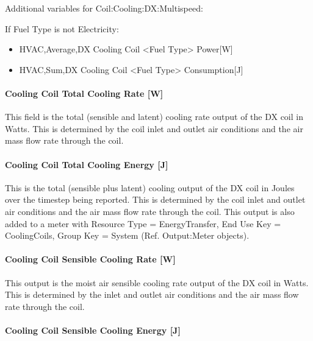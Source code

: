 Additional variables for Coil:Cooling:DX:Multispeed:

If Fuel Type is not Electricity:

\begin{itemize}
\item
  HVAC,Average,DX Cooling Coil \textless{}Fuel Type\textgreater{} Power{[}W{]}
\item
  HVAC,Sum,DX Cooling Coil \textless{}Fuel Type\textgreater{} Consumption{[}J{]}
\end{itemize}

\paragraph{Cooling Coil Total Cooling Rate {[}W{]}}\label{cooling-coil-total-cooling-rate-w-4}

This field is the total (sensible and latent) cooling rate output of the DX coil in Watts. This is determined by the coil inlet and outlet air conditions and the air mass flow rate through the coil.

\paragraph{Cooling Coil Total Cooling Energy {[}J{]}}\label{cooling-coil-total-cooling-energy-j-4}

This is the total (sensible plus latent) cooling output of the DX coil in Joules over the timestep being reported. This is determined by the coil inlet and outlet air conditions and the air mass flow rate through the coil. This output is also added to a meter with Resource Type = EnergyTransfer, End Use Key = CoolingCoils, Group Key = System (Ref. Output:Meter objects).

\paragraph{Cooling Coil Sensible Cooling Rate {[}W{]}}\label{cooling-coil-sensible-cooling-rate-w-4}

This output is the moist air sensible cooling rate output of the DX coil in Watts. This is determined by the inlet and outlet air conditions and the air mass flow rate through the coil.

\paragraph{Cooling Coil Sensible Cooling Energy {[}J{]}}\label{cooling-coil-sensible-cooling-energy-j-4}

